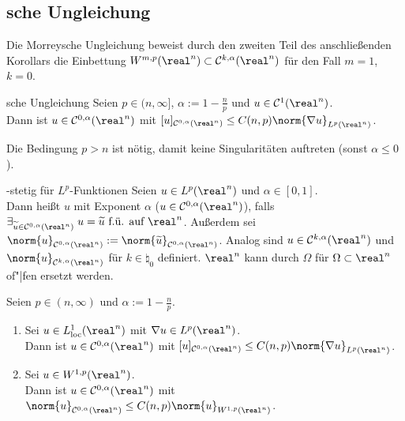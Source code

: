 \pagebreak

\subsection{%
    sche Ungleichung%
}

\begin{Bem}
    Die Morreysche Ungleichung beweist durch den zweiten Teil des anschließenden Korollars
    die Einbettung $W^{m,p}(\real^n) \subset \C^{k,\alpha}(\real^n)$ für den Fall
    $m = 1$, $k = 0$.
\end{Bem}

\begin{Satz}{sche Ungleichung}
    Seien $p \in (n, \infty]$, $\alpha := 1 - \frac{n}{p}$ und $u \in \C^1(\real^n)$.\\
    Dann ist $u \in \C^{0,\alpha}(\real^n)$ mit
    $[u]_{\C^{0,\alpha}(\real^n)} \le C(n,p) \norm{\nabla u}_{L^p(\real^n)}$.
\end{Satz}

\begin{Bem}
    Die Bedingung $p > n$ ist nötig, damit keine Singularitäten auftreten
    (sonst $\alpha \le 0$).
\end{Bem}

\linie

\begin{Def}{-stetig für $L^p$-Funktionen}
    Seien $u \in L^p(\real^n)$ und $\alpha \in [0, 1]$.\\
    Dann heißt $u$  mit Exponent $\alpha$
    ($u \in \C^{0,\alpha}(\real^n)$), falls
    $\exists_{\widetilde{u} \in \C^{0,\alpha}(\real^n)}\;
    u = \widetilde{u} \text{ f.ü. auf } \real^n$.
    Außerdem sei $\norm{u}_{\C^{0,\alpha}(\real^n)} :=
    \norm{\widetilde{u}}_{\C^{0,\alpha}(\real^n)}$.
    Analog sind $u \in \C^{k,\alpha}(\real^n)$ und $\norm{u}_{\C^{k,\alpha}(\real^n)}$
    für $k \in \natural_0$ definiert.
    $\real^n$ kann durch $\Omega$ für $\Omega \subset \real^n$ of"|fen ersetzt werden.
\end{Def}

\begin{Kor}
    Seien $p \in (n, \infty)$ und $\alpha := 1 - \frac{n}{p}$.
    \begin{enumerate}
        \item
        Sei $u \in L^1_\loc(\real^n)$ mit $\nabla u \in L^p(\real^n)$.\\
        Dann ist $u \in \C^{0,\alpha}(\real^n)$ mit
        $[u]_{\C^{0,\alpha}(\real^n)} \le C(n,p) \norm{\nabla u}_{L^p(\real^n)}$.

        \item
        Sei $u \in W^{1,p}(\real^n)$.\\
        Dann ist $u \in \C^{0,\alpha}(\real^n)$ mit
        $\norm{u}_{\C^{0,\alpha}(\real^n)} \le C(n,p) \norm{u}_{W^{1,p}(\real^n)}$.
    \end{enumerate}
\end{Kor}

